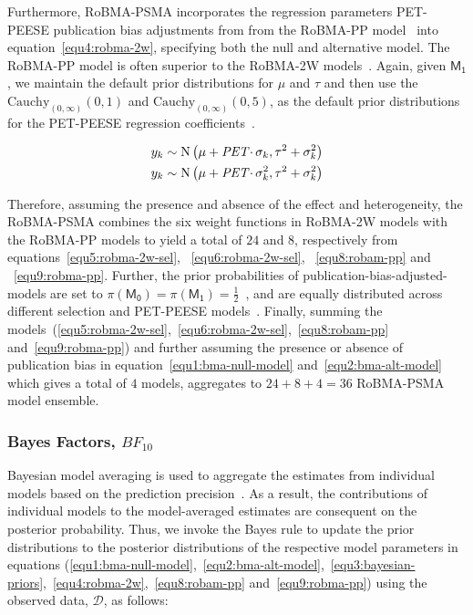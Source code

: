 \documentclass[12pt, english]{article}
\begin{document}
    Furthermore, RoBMA-PSMA incorporates the regression parameters PET-PEESE publication bias adjustments from from the RoBMA-PP model~\parencite{bartos2021, bartos2022} into equation~\ref{equ4:robma-2w}, specifying both the null and alternative model. The RoBMA-PP model is often superior to the RoBMA-2W models~\parencites{kvarven2020,cartermccullough2014,moreno2009}. Again, given $\mathsf{M_1}$, we maintain the default prior distributions for $\mu$ and $\tau$ and then use the $\text{Cauchy}_{(0, \infty)} (0,1)$ and $\text{Cauchy}_{(0, \infty)} (0,5)$, as the default prior distributions for the PET-PEESE regression coefficients~\parencites{bartos2022, stanleydoucouliagos2014}.

    \begin{align}
        y_k & \sim \text{N} \left(\mu+ \text{\textit{PET}} \cdotp \sigma_k, \tau^{2} + \sigma_k^{2} \right) \label{equ8:robam-pp} \\
        y_k & \sim \text{N} \left(\mu+ \text{\textit{PET}} \cdotp \sigma_k^2, \tau^{2} + \sigma_k^{2} \right) \label{equ9:robma-pp}
    \end{align}

    Therefore, assuming the presence and absence of the effect and heterogeneity, the RoBMA-PSMA combines the six weight functions in RoBMA-2W models with the RoBMA-PP models to yield a total of $24$ and $8$, respectively from equations~\ref{equ5:robma-2w-sel}, ~\ref{equ6:robma-2w-sel}, ~\ref{equ8:robam-pp} and ~\ref{equ9:robma-pp}. Further, the prior probabilities of publication-bias-adjusted-models are set to $\pi(\mathsf{M_0}) = \pi(\mathsf{M_1}) = \frac{1}{2}$~\parencite{maier2022}, and are equally distributed across different selection and PET-PEESE models~\parencites{gronau2021, clyde2011, hoeting1999, jeffreys1998}. Finally, summing the models~(\ref{equ5:robma-2w-sel},~\ref{equ6:robma-2w-sel},~\ref{equ8:robam-pp} and~\ref{equ9:robma-pp}) and further assuming the presence or absence of publication bias in equation~\ref{equ1:bma-null-model} and~\ref{equ2:bma-alt-model} which gives a total of $4$ models, aggregates to $24 + 8 + 4 = 36$ RoBMA-PSMA model ensemble.

    \subsubsection{Bayes Factors, $BF_{10}$}\label{subsubsec2.3.2:bayes-factors-$bf_{10}$}
    Bayesian model averaging is used to aggregate the estimates from individual models based on the prediction precision~\parencites{hinne2020, hoeting1999, leamer1978}. As a result, the contributions of individual models to the model-averaged estimates are consequent on the posterior probability. Thus, we invoke the Bayes rule to update the prior distributions to the posterior distributions of the respective model parameters in equations (\ref{equ1:bma-null-model},~\ref{equ2:bma-alt-model},~\ref{equ3:bayesian-priors},~\ref{equ4:robma-2w},~\ref{equ8:robam-pp} and~\ref{equ9:robma-pp}) using the observed data, $\mathcal{D}$, as follows:
\end{document}
